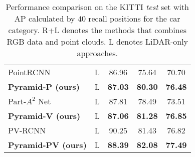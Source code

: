 \documentclass[10pt,twocolumn,letterpaper]{article}
\begin{document}
\begin{table}[]
{\begin{tabular}{|l|c| c c c|}
\midrule
PointRCNN~\cite{shi2019pointrcnn}   & L             & 86.96  & 75.64  & 70.70  \\
\textbf{Pyramid-P (ours)}    & L         & \textbf{87.03} & \textbf{80.30} & \textbf{76.48}  \\
\midrule
Part-$A^{2}$ Net~\cite{shi2020points} & L           & 87.81  & 78.49  & 73.51  \\
\textbf{Pyramid-V (ours)}       & L & \textbf{87.06}  & \textbf{81.28} & \textbf{76.85}\\
\midrule
PV-RCNN~\cite{shi2020pv}        & L                 & 90.25  & 81.43  & 76.82  \\
\textbf{Pyramid-PV (ours)}      & L & \textbf{88.39}  & \textbf{82.08}  & \textbf{77.49} \\ 
\bottomrule
\end{tabular}}
\setlength{\belowcaptionskip}{10pt}
\caption{Performance comparison on the KITTI \textit{test} set with AP calculated by $40$ recall positions for the car category. R+L denotes the methods that combines RGB data and point clouds. L denotes LiDAR-only approaches.} \label{table_kitti_1}
\vspace{-3mm}
\end{table}

\begin{table}[]
\setlength{\belowcaptionskip}{10pt}
\caption{Performance comparison on the KITTI \textit{val} split with AP calculated by $11$ recall positions for the car category.} \label{table_kitti_2}
\vspace{-3mm}
\end{table}
\end{document}
